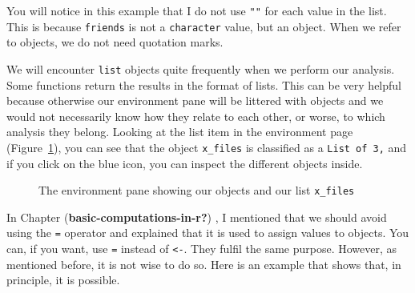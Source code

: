 \documentclass[
  letterpaper,
]{krantz}
\begin{document}
You will notice in this example that I do not use \texttt{""} for each
value in the list. This is because \texttt{friends} is not a
\texttt{character} value, but an object. When we refer to objects, we do
not need quotation marks.

We will encounter \texttt{list} objects quite frequently when we perform
our analysis. Some functions return the results in the format of lists.
This can be very helpful because otherwise our environment pane will be
littered with objects and we would not necessarily know how they relate
to each other, or worse, to which analysis they belong. Looking at the
list item in the environment page (Figure~\ref{fig-img-x-files}), you
can see that the object \texttt{x\_files} is classified as a
\texttt{List\ of\ 3,} and if you click on the blue icon, you can inspect
the different objects inside.

\begin{figure}


\caption{\label{fig-img-x-files}The environment pane showing our objects
and our list \texttt{x\_files}}

\end{figure}%

In Chapter (\textbf{basic-computations-in-r?}) , I mentioned that we
should avoid using the \texttt{=} operator and explained that it is used
to assign values to objects. You can, if you want, use \texttt{=}
instead of \texttt{\textless{}-}. They fulfil the same purpose. However,
as mentioned before, it is not wise to do so. Here is an example that
shows that, in principle, it is possible.
\end{document}
